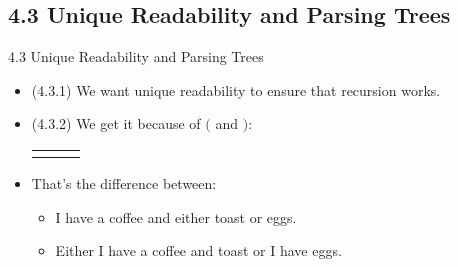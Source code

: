 \documentclass[../slides.tex]{subfiles}
\begin{document}
\subsection{4.3 Unique Readability and Parsing Trees}

\begin{frame}{4.3 Unique Readability and Parsing Trees}

	\begin{itemize}
	
		\item (4.3.1) We want unique readability to ensure that recursion works.
		
		\item (4.3.2) We get it because of $($ and $)$:
		
	\begin{center}
		
		\begin{tabular}{c c c}
		\begin{tikzpicture}
		{\Tree [.$p\land q\lor r$ [.$p$ ] [.$q\lor r$ [.$q$ ] [.$r$ ] ] ]}
		\end{tikzpicture}

		& 
		
		\qquad \raisebox{7.5ex}{vs.} \qquad 
				\begin{tikzpicture}

		{\Tree [.$p\land q\lor r$ [.$p\land q$ [.$p$ ] [.$q$ ] ] [.$r$ ] ]}
		\end{tikzpicture}

		\end{tabular}
		\end{center}
		
		\item That's the difference between:
		\begin{itemize}
	
		\item I have a coffee and either toast or eggs.
		
		\item Either I have a coffee and toast or I have eggs.
	
	\end{itemize}
	
	\end{itemize}

\end{frame}
\end{document}
